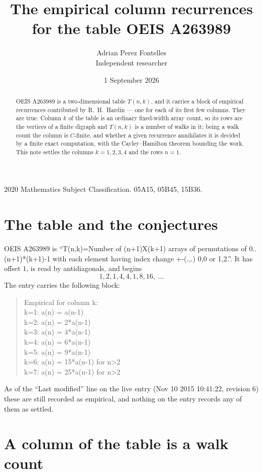 \documentclass[11pt,a4paper]{article}
\title{The empirical column recurrences for the table OEIS A263989}
\author{Adrian Perez Fontelles\\ \small Independent researcher}
\date{1 September 2026}
\theoremstyle{plain}
\theoremstyle{definition}
\begin{document}
\maketitle

\begin{abstract}
OEIS A263989 is a two-dimensional table $T(n,k)$, and it carries a block of empirical
recurrences contributed by R.~H.~Hardin --- one for each of its first few columns. They are
true. Column $k$ of the table is an ordinary fixed-width array count, so its rows are the
vertices of a finite digraph and $T(n,k)$ is a number of walks in it; being a walk count the
column is $C$-finite, and whether a given recurrence annihilates it is decided by a finite
exact computation, with the Cayley--Hamilton theorem bounding the work. This note settles the columns $k=1, 2, 3, 4$ and the rows $n=1$.
\end{abstract}

\noindent\small 2020 Mathematics Subject Classification. 05A15, 05B45, 15B36.\normalsize

\section{The table and the conjectures}

OEIS A263989 is ``T(n,k)=Number of (n+1)X(k+1) arrays of permutations of 0..(n+1)*(k+1)-1 with each element having index change +-(.,.) 0,0 or 1,2.''. It has offset $1$, is
read by antidiagonals, and begins
\[
1, 2, 1, 4, 4, 1, 8, 16,\ \dots
\]
The entry carries the following block:
\begin{quote}\small
Empirical for column k:\\
k=1: a(n) = a(n-1)\\
k=2: a(n) = 2*a(n-1)\\
k=3: a(n) = 4*a(n-1)\\
k=4: a(n) = 6*a(n-1)\\
k=5: a(n) = 9*a(n-1)\\
k=6: a(n) = 15*a(n-1) for n>2\\
k=7: a(n) = 25*a(n-1) for n>2\\
\end{quote}
As of the ``Last modified'' line on the live entry (Nov 10 2015 10:41:22, revision 6) these are still
recorded as empirical, and nothing on the entry records any of them as settled.

\section{A column of the table is a walk count}
\end{document}

